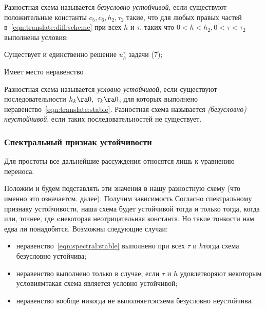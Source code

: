 \documentclass[a4paper]{article}
\begin{document}
\begin{df}
Разностная схема называется \emph{безусловно устойчивой}, если
существуют положительные константы $c_5, c_6, h_2, \tau_2$ такие,
что для любых правых частей в~\eqref{eqn:translate:diff:scheme} при всех $h$ и $\tau$, таких что
$0<h<h_2, 0<\tau<\tau_2$ выполнены условия:

\begin{nums}{-3}
\item Существует и единственно решение $u_h^{\tau}$ задачи
(7);
\item Имеет место неравенство 
\end{nums}
\end{df}

Разностная схема называется \emph{условно устойчивой}, если
существуют последовательности $h_k\ra0,\ \tau_k\ra0$, для которых
выполнено неравенство~\eqref{eqn:translate:stable}. Разностная схема называется
\emph{(безусловно) неустойчивой}, если таких последовательностей не
существует.

\subsubsection{Спектральный признак устойчивости}

Для простоты все дальнейшие рассуждения относятся лишь к уравнению переноса.

Положим
и будем подставлять эти значения
в нашу разностную схему (что именно это означает\т см. далее).
Получим зависимость  Согласно
спектральному признаку устойчивости, наша схема будет устойчивой
тогда и только тогда, когда  или, точнее,
\eqn{|\la|\le\kappa\tau,} где $\kappa$\т некоторая неотрицательная
константа. Но такие тонкости нам едва ли понадобятся. Возможны
следующие случаи:
\begin{itemize}
  \item неравенство~\eqref{eqn:spectral:stable} выполнено при всех $\tau$ и $h$\т тогда
  схема безусловно устойчива;
  \item неравенство выполнено только в случае, если $\tau$ и $h$
  удовлетворяют некоторым условиям\т такая схема является условно
  устойчивой;
  \item неравенство вообще никогда не выполняется\т схема
  безусловно неустойчива.
\end{itemize}
\end{document}
